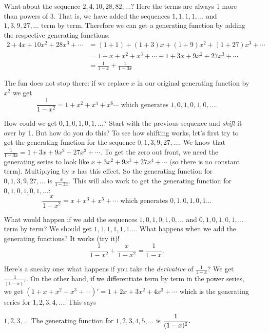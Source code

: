 \documentclass[12pt]{article}
\begin{document}
What about the sequence $2, 4, 10, 28, 82, \ldots$?  Here the terms are always 1 more than powers of 3.  That is, we have added the sequences $1,1,1,1,\ldots$ and $1,3,9, 27,\ldots$ term by term.  Therefore we can get a generating function by adding the respective generating functions:
\begin{align*}
2 + 4x + 10x^2 + 28x^3 + \cdots  & = (1 + 1) + (1 + 3)x + (1 + 9)x^2 + (1 + 27)x^3 + \cdots \\
& = 1 + x + x^2 + x^3 + \cdots + 1 + 3x + 9x^2 + 27x^3 + \cdots \\
& = \frac{1}{1-x} + \frac{1}{1-3x}
\end{align*}

The fun does not stop there: if we replace $x$ in our original generating function by $x^2$ we get
 \[\frac{1}{1-x^2} = 1 + x^2  + x^4 + x^6\cdots \mbox{ which generates } 1, 0, 1, 0, 1, 0, \ldots.\]

How could we get $0,1,0,1,0,1,\ldots$?  Start with the previous sequence and {\em shift} it over by 1.  But how do you do this?  To see how shifting works, let's first try to get the generating function for the sequence $0, 1, 3, 9, 27, \ldots$.  We know that $\frac{1}{1-3x} = 1 + 3x + 9x^2 + 27x^3 + \cdots$.  To get the zero out front, we need the generating series to look like $x + 3x^2 + 9x^3 + 27x^4+ \cdots$ (so there is no constant term).  Multiplying by $x$ has this effect.  So the generating function for $0, 1, 3, 9, 27, \ldots$ is $\frac{x}{1-3x}$.  This will also work to get the generating function for $0,1,0,1,0,1,\ldots$:
 \[\frac{x}{1-x^2} = x + x^3 + x^5 + \cdots \mbox{ which generates } 0, 1, 0, 1, 0 , 1 \ldots\]

What would happen if we add the sequences $1,0,1,0,1,0,\ldots$ and $0,1,0,1,0,1,\ldots$ term by term?  We should get $1,1,1,1,1,1\ldots$.  What happens when we add the generating functions?  It works (try it)!
 \[\frac{1}{1-x^2} + \frac{x}{1-x^2} = \frac{1}{1-x}.\]


Here's a sneaky one: what happens if you take the \emph{derivative} of $\frac{1}{1-x}$?  We get $\frac{1}{(1-x)^2}$.  On the other hand, if we differentiate term by term in the power series, we get $(1 + x + x^2 + x^3 + \cdots)' = 1 + 2x + 3x^2 + 4x^3 + \cdots $ which is the generating series for $1, 2, 3, 4, \ldots$.  This says

\begin{defbox}{$1,2,3,\ldots$}
 The generating function for $1, 2, 3, 4, 5, \ldots$ is $\displaystyle\frac{1}{(1-x)^2}.$
\end{defbox}
\end{document}
